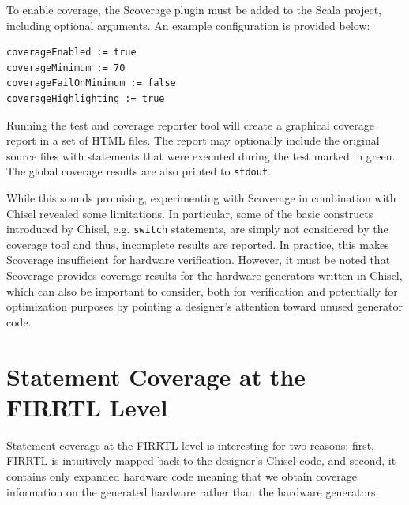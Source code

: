 \documentclass[conference]{IEEEtran}
\begin{document}
To enable coverage, the Scoverage plugin must be added to the Scala project, including optional arguments.
An example configuration is provided below:
\begin{verbatim}
coverageEnabled := true
coverageMinimum := 70
coverageFailOnMinimum := false
coverageHighlighting := true
\end{verbatim}
Running the test and coverage reporter tool will create a graphical coverage report in a set of HTML files. The report may optionally include the original source files with statements that were executed during the test marked in green. The global coverage results are also printed to \texttt{stdout}.

While this sounds promising, experimenting with Scoverage in combination with Chisel revealed some limitations. In particular, some of the basic constructs introduced by Chisel, e.g. \texttt{switch} statements, are simply not considered by the coverage tool and thus, incomplete results are reported. In practice, this makes Scoverage insufficient for hardware verification. However, it must be noted that Scoverage provides coverage results for the hardware generators written in Chisel, which can also be important to consider, both for verification and potentially for optimization purposes by pointing a designer's attention toward unused generator code.

\section{Statement Coverage at the FIRRTL Level}  
Statement coverage at the FIRRTL level is interesting for two reasons; first, FIRRTL is intuitively mapped back to the designer's Chisel code, and second, it contains only expanded hardware code meaning that we obtain coverage information on the generated hardware rather than the hardware generators.%
\end{document}
